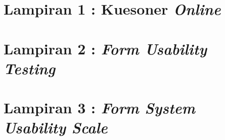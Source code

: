 \chapter*{Lampiran 1 : Kuesoner \textit{Online}}



\chapter*{Lampiran 2 : \textit{Form Usability Testing}}


\chapter*{Lampiran 3 : \textit{Form System Usability Scale}}


